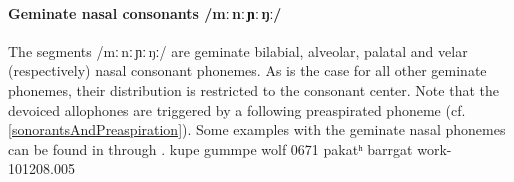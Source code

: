 \paragraph{Geminate nasal consonants /mː\,nː\,ɲː\,ŋː/}
The segments /mː\,nː\,ɲː\,ŋː/ are geminate bilabial, alveolar, palatal and velar (respectively) nasal consonant phonemes. 
As is the case for all other geminate phonemes, their distribution is restricted to the consonant center. 
Note that the devoiced allophones are triggered by a following preaspirated phoneme (cf. \SEC\ref{sonorantsAndPreaspiration}). 
Some examples with the geminate nasal phonemes can be found in  through .
	{kupe}	{gummpe}	{wolf\BS{}}		{0671}
	{pakatʰ}	{barrgat}	{work-}			{101208}{.005}



